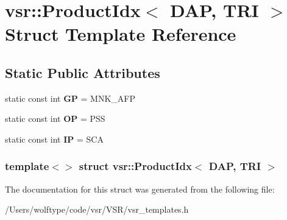 \hypertarget{structvsr_1_1_product_idx_3_01_d_a_p_00_01_t_r_i_01_4}{\section{vsr\-:\-:Product\-Idx$<$ D\-A\-P, T\-R\-I $>$ Struct Template Reference}
\label{structvsr_1_1_product_idx_3_01_d_a_p_00_01_t_r_i_01_4}
}
\subsection*{Static Public Attributes}
\begin{DoxyCompactItemize}
\item 
\hypertarget{structvsr_1_1_product_idx_3_01_d_a_p_00_01_t_r_i_01_4_ac1c1ffa8887c15e69dacec380f5f3bfa}{static const int {\bfseries G\-P} = M\-N\-K\-\_\-\-A\-F\-P}\label{structvsr_1_1_product_idx_3_01_d_a_p_00_01_t_r_i_01_4_ac1c1ffa8887c15e69dacec380f5f3bfa}

\item 
\hypertarget{structvsr_1_1_product_idx_3_01_d_a_p_00_01_t_r_i_01_4_a5e613dcb6961a0d0a48c0ff4d8547281}{static const int {\bfseries O\-P} = P\-S\-S}\label{structvsr_1_1_product_idx_3_01_d_a_p_00_01_t_r_i_01_4_a5e613dcb6961a0d0a48c0ff4d8547281}

\item 
\hypertarget{structvsr_1_1_product_idx_3_01_d_a_p_00_01_t_r_i_01_4_a2619db30e29dc7e152955976e4f6a7fd}{static const int {\bfseries I\-P} = S\-C\-A}\label{structvsr_1_1_product_idx_3_01_d_a_p_00_01_t_r_i_01_4_a2619db30e29dc7e152955976e4f6a7fd}

\end{DoxyCompactItemize}
\subsubsection*{template$<$$>$ struct vsr\-::\-Product\-Idx$<$ D\-A\-P, T\-R\-I $>$}



The documentation for this struct was generated from the following file\-:\begin{DoxyCompactItemize}
\item 
/\-Users/wolftype/code/vsr/\-V\-S\-R/vsr\-\_\-templates.\-h\end{DoxyCompactItemize}

